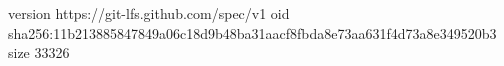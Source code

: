 version https://git-lfs.github.com/spec/v1
oid sha256:11b213885847849a06c18d9b48ba31aacf8fbda8e73aa631f4d73a8e349520b3
size 33326
